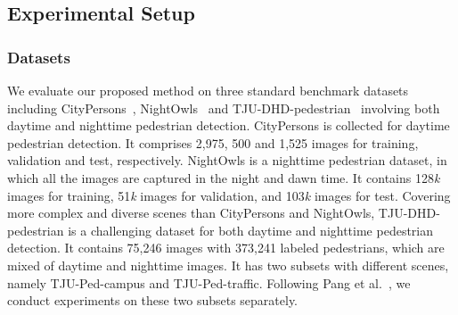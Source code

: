 \documentclass[journal]{IEEEtran}
\begin{document}
\subsection{Experimental Setup}

\subsubsection{Datasets}
We evaluate our proposed method on three standard benchmark datasets including CityPersons~\cite{zhang2017citypersons}, NightOwls~\cite{neumann2018nightowls} and TJU-DHD-pedestrian~\cite{pang2020tju} involving both daytime and nighttime pedestrian detection. CityPersons is collected for daytime pedestrian detection. It comprises 2,975, 500 and 1,525 images for training, validation and test, respectively.  NightOwls is a nighttime pedestrian dataset, in which all the images are captured in the night and dawn time. It contains 128\emph{k} images for training, 51\emph{k} images for validation, and 103\emph{k} images for test. Covering more complex and diverse scenes than CityPersons and NightOwls, TJU-DHD-pedestrian is a challenging dataset for both daytime and nighttime pedestrian detection. It contains 75,246 images with 373,241 labeled pedestrians, which are mixed of daytime and nighttime images. It has two subsets with different scenes, namely  TJU-Ped-campus and TJU-Ped-traffic. Following Pang et al.~\cite{pang2020tju}, we conduct experiments on these two subsets separately.
\end{document}
